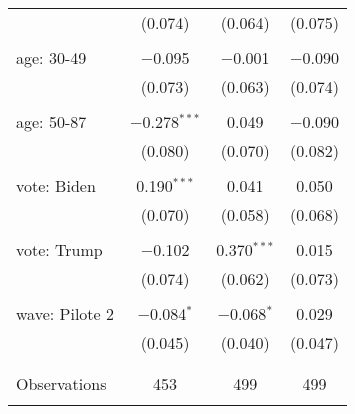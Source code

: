 \begin{tabular}{@{\extracolsep{5pt}}lccc}
  & (0.074) & (0.064) & (0.075) \\ 
  & & & \\ 
 age: 30-49 & $-$0.095 & $-$0.001 & $-$0.090 \\ 
  & (0.073) & (0.063) & (0.074) \\ 
  & & & \\ 
 age: 50-87 & $-$0.278$^{***}$ & 0.049 & $-$0.090 \\ 
  & (0.080) & (0.070) & (0.082) \\ 
  & & & \\ 
 vote: Biden & 0.190$^{***}$ & 0.041 & 0.050 \\ 
  & (0.070) & (0.058) & (0.068) \\ 
  & & & \\ 
 vote: Trump & $-$0.102 & 0.370$^{***}$ & 0.015 \\ 
  & (0.074) & (0.062) & (0.073) \\ 
  & & & \\ 
 wave: Pilote 2 & $-$0.084$^{*}$ & $-$0.068$^{*}$ & 0.029 \\ 
  & (0.045) & (0.040) & (0.047) \\ 
  & & & \\ 
\hline \\[-1.8ex] 

Observations & 453 & 499 & 499 \\ 
\hline 
\hline \\[-1.8ex] 
\end{tabular} 